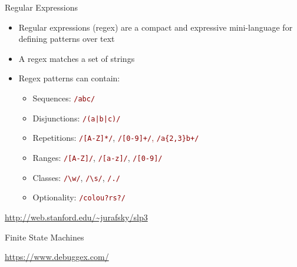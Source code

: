 \documentclass[10pt]{beamer}
\begin{document}
\begin{frame}{Regular Expressions}
\begin{itemize}
  \item \alert{Regular expressions} (regex) are a compact and expressive mini-language for defining \alert{patterns} over text
  \item A regex \alert{matches} a set of strings
  \item Regex patterns can contain:
  \begin{itemize}
    \item Sequences: \textcolor{darkred}{\texttt{/abc/}}
    \item Disjunctions: \textcolor{darkred}{\texttt{/(a|b|c)/}}
    \item Repetitions: \textcolor{darkred}{\texttt{/[A-Z]*/}}, \textcolor{darkred}{\texttt{/[0-9]+/}, \textcolor{darkred}{\texttt{/a\{2,3\}b+/}}}
    \item Ranges: \textcolor{darkred}{\texttt{/[A-Z]/}}, \textcolor{darkred}{\texttt{/[a-z]/}}, \textcolor{darkred}{\texttt{/[0-9]/}}
    \item Classes: \textcolor{darkred}{\texttt{/\textbackslash w/}}, \textcolor{darkred}{\texttt{/\textbackslash s/}}, \textcolor{darkred}{\texttt{/./}}
    \item Optionality: \textcolor{darkred}{\texttt{/colou?rs?/}}
  \end{itemize}
\end{itemize}
\begin{center}
  \textcolor{blue}{\url{http://web.stanford.edu/~jurafsky/slp3}}
\end{center}
\end{frame}

\begin{frame}{Finite State Machines}
  \begin{center}
  \end{center}
  \begin{center}
    \textcolor{blue}{\url{https://www.debuggex.com/}}
  \end{center}
\end{frame}
\end{document}
